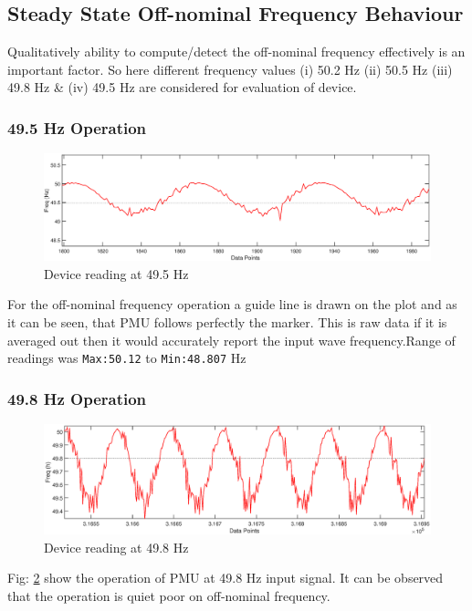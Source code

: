 \subsection{Steady State Off-nominal Frequency Behaviour}
Qualitatively ability to compute/detect the off-nominal frequency effectively is an important factor. So here different frequency values (i) 50.2 Hz (ii) 50.5 Hz (iii) 49.8 Hz \& (iv) 49.5 Hz are considered for evaluation of device. 

\subsubsection{49.5 Hz Operation}
\begin{figure}[h]
	\includegraphics[width=\textwidth]{fig/495Hz_freq_reading.eps}
	\caption{Device reading at 49.5 Hz}
	\label{fig:49.5Hz operation}
\end{figure}
For the off-nominal frequency operation a guide line is drawn on the plot and as it can be seen, that PMU follows perfectly the marker. This is raw data if it is averaged out then it would accurately report the input wave frequency.Range of readings was \texttt{Max:50.12} to \texttt{Min:48.807} Hz

\subsubsection{49.8 Hz Operation}
\begin{figure}[h]
	\includegraphics[width=\textwidth]{fig/498Hz_freq.eps}
	\caption{Device reading at 49.8 Hz}
	\label{fig:49.8Hz operation}
\end{figure}
Fig: \ref{fig:49.8Hz operation} show the operation of PMU at 49.8 Hz input signal. It can be observed that the operation is quiet poor on off-nominal frequency.

